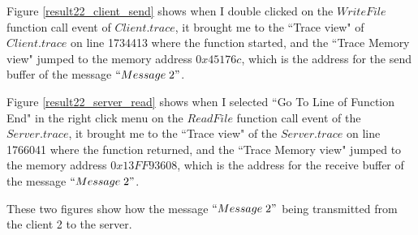 Figure \ref{result22_client_send} shows when I double clicked on the $WriteFile$ function call event of $Client.trace$, it brought me to the ``Trace view" of $Client.trace$ on line 1734413 where the function started, and the ``Trace Memory view" jumped to the memory address $0x45176c$, which is the address for the send buffer of the message $``Message\; 2"$.

Figure \ref{result22_server_read} shows when I selected ``Go To Line of Function End" in the right click menu on the $ReadFile$ function call event of the $Server.trace$, it brought me to the ``Trace view" of the $Server.trace$ on line 1766041 where the function returned, and the ``Trace Memory view" jumped to the memory address $0x13FF93608$, which is the address for the receive buffer of the message $``Message\; 2"$.

These two figures show how the message $``Message\; 2"$ being transmitted from the client 2 to the server.


